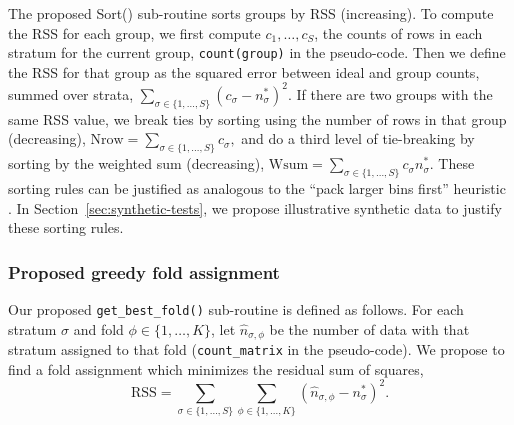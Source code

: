 \documentclass[twoside]{article}
\begin{document}
The proposed Sort() sub-routine sorts groups by RSS (increasing).
To compute the RSS for each group, we first compute $c_1,\dots,c_S $, the counts of rows in each stratum for the current group, \texttt{count(group)} in the pseudo-code.
Then we define the RSS for that group as the squared error between ideal and group counts, summed over strata,
$
\sum_{\sigma\in\{1,\dots,S\}}
(c_{\sigma} - n^*_\sigma)^2.
$
If there are two groups with the same RSS value, we break ties by sorting using the number of rows in that group (decreasing),
$\text{Nrow}=
\sum_{\sigma\in\{1,\dots,S\}}
c_{\sigma},
$
and do a third level of tie-breaking by sorting by the weighted sum (decreasing),
$\text{Wsum}=
\sum_{\sigma\in\{1,\dots,S\}}
c_{\sigma}n^*_\sigma.
$
These sorting rules can be justified as analogous to the ``pack larger bins first'' heuristic \citep{Johnson2016}.
In Section~\ref{sec:synthetic-tests}, we propose illustrative synthetic data to justify these sorting rules.

\subsubsection{Proposed greedy fold assignment}

Our proposed \texttt{get\_best\_fold()} sub-routine is defined as follows.
For each stratum $\sigma$ and fold $\phi\in\{1,\dots,K\}$, let $\hat n_{\sigma,\phi}$ be the number of data with that stratum assigned to that fold (\texttt{count\_matrix} in the pseudo-code).
We propose to find a fold assignment which minimizes the residual sum of squares,
\begin{equation}
\text{RSS}=
\sum_{\sigma\in\{1,\dots,S\}}
\sum_{\phi\in\{1,\dots,K\}}
(\hat n_{\sigma,\phi} - n^*_\sigma)^2.
\label{eq:RSS}
\end{equation}
\end{document}
